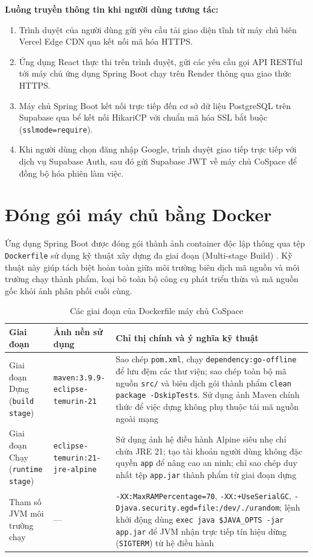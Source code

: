 \noindent\textbf{Luồng truyền thông tin khi người dùng tương tác:}
\begin{enumerate}
    \item Trình duyệt của người dùng gửi yêu cầu tải giao diện tĩnh từ máy chủ biên Vercel Edge CDN qua kết nối mã hóa HTTPS.
    \item Ứng dụng React thực thi trên trình duyệt, gửi các yêu cầu gọi API RESTful tới máy chủ ứng dụng Spring Boot chạy trên Render thông qua giao thức HTTPS.
    \item Máy chủ Spring Boot kết nối trực tiếp đến cơ sở dữ liệu PostgreSQL trên Supabase qua bể kết nối HikariCP với chuẩn mã hóa SSL bắt buộc (\texttt{sslmode=require}).
    \item Khi người dùng chọn đăng nhập Google, trình duyệt giao tiếp trực tiếp với dịch vụ Supabase Auth, sau đó gửi Supabase JWT về máy chủ CoSpace để đồng bộ hóa phiên làm việc.
\end{enumerate}

\section{Đóng gói máy chủ bằng Docker}
\label{sec:tk_docker}

Ứng dụng Spring Boot được đóng gói thành ảnh container độc lập thông qua tệp \texttt{Dockerfile} sử dụng kỹ thuật xây dựng đa giai đoạn (Multi-stage Build) \cite{docker_docs}. Kỹ thuật này giúp tách biệt hoàn toàn giữa môi trường biên dịch mã nguồn và môi trường chạy thành phẩm, loại bỏ toàn bộ công cụ phát triển thừa và mã nguồn gốc khỏi ảnh phân phối cuối cùng.

\begin{table}[H]
\centering
\caption{Các giai đoạn của Dockerfile máy chủ CoSpace}
\label{tab:tk_docker}
\small
\renewcommand{\arraystretch}{1.25}
\begin{tabular}{|p{2.6cm}|p{3.8cm}|p{7.4cm}|}
\hline
\textbf{Giai đoạn} & \textbf{Ảnh nền sử dụng} & \textbf{Chỉ thị chính và ý nghĩa kỹ thuật} \\
\hline
Giai đoạn Dựng (\texttt{build stage}) & \texttt{maven:3.9.9-\allowbreak eclipse-temurin-21} & Sao chép \texttt{pom.xml}, chạy \texttt{dependency:go-offline} để lưu đệm các thư viện; sao chép toàn bộ mã nguồn \texttt{src/} và biên dịch gói thành phẩm \texttt{clean package -DskipTests}. Sử dụng ảnh Maven chính thức để việc dựng không phụ thuộc tải mã nguồn ngoài mạng \\
\hline
Giai đoạn Chạy (\texttt{runtime stage}) & \texttt{eclipse-temurin:21-\allowbreak jre-alpine} & Sử dụng ảnh hệ điều hành Alpine siêu nhẹ chỉ chứa JRE 21; tạo tài khoản người dùng không đặc quyền \texttt{app} để nâng cao an ninh; chỉ sao chép duy nhất tệp \texttt{app.jar} thành phẩm từ giai đoạn dựng \\
\hline
Tham số JVM môi trường chạy & --- & \texttt{-XX:MaxRAMPercentage=70}, \texttt{-XX:+UseSerialGC}, \texttt{-Djava.security.egd=file:/dev/./urandom}; lệnh khởi động dùng \texttt{exec java \$JAVA\_OPTS -jar app.jar} để JVM nhận trực tiếp tín hiệu dừng (\texttt{SIGTERM}) từ hệ điều hành \\
\hline
\end{tabular}
\end{table}


